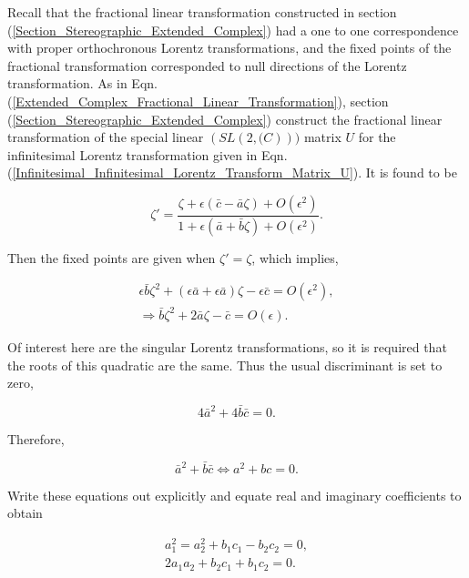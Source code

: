 Recall that the fractional linear transformation constructed in section (\ref{Section_Stereographic_Extended_Complex}) had a one to one correspondence with proper orthochronous Lorentz transformations, and the fixed points of the fractional transformation corresponded to null directions of the Lorentz transformation. As in Eqn.(\ref{Extended_Complex_Fractional_Linear_Transformation}), section (\ref{Section_Stereographic_Extended_Complex}) construct the fractional linear transformation of the special linear $(SL(2, \mathbb(C)))$ matrix $U$ for the infinitesimal Lorentz transformation given in Eqn.(\ref{Infinitesimal_Infinitesimal_Lorentz_Transform_Matrix_U}). It is found to be

\begin{equation*}   
\zeta' = \frac{\zeta + \epsilon(\bar{c} - \bar{a}\zeta) + O(\epsilon^2)}{1 + \epsilon(\bar{a} + \bar{b} \zeta) + O(\epsilon^2)}.
\end{equation*}

\noindent Then the fixed points are given when $\zeta' = \zeta$, which implies,

\begin{eqnarray}\nonumber
\epsilon \bar{b} \zeta^2 + (\epsilon \bar{a} + \epsilon \bar{a})\zeta - \epsilon \bar{c} = O(\epsilon^2), \\ \label{Infinitesimal_fixed_point_quadratic}
\Rightarrow \bar{b} \zeta^2 + 2 \bar{a} \zeta - \bar{c} = O(\epsilon).
\end{eqnarray}

\noindent Of interest here are the singular Lorentz transformations, so it is required that the roots of this quadratic are the same. Thus the usual discriminant is set to zero,

\begin{equation*} 
4 {\bar{a}}^2 + 4 \bar{b} \bar{c} = 0.
\end{equation*} 

\noindent Therefore,

\begin{equation}\label{Infinitesimal_Fractional_Cond_on_abc}
{\bar{a}}^2 +  \bar{b} \bar{c} \Leftrightarrow a^2 + bc = 0.
\end{equation}

\noindent Write these equations out explicitly and equate real and imaginary coefficients to obtain

\begin{eqnarray}\label{Infinitesimal_discriminant_relation_1}
a_1^2 = a_2^2 + b_1 c_1 - b_2 c_2 = 0, \\\label{Infinitesimal_discriminant_relation_2}
2a_1 a_2 + b_2 c_1 + b_1 c_2 = 0.
\end{eqnarray}

